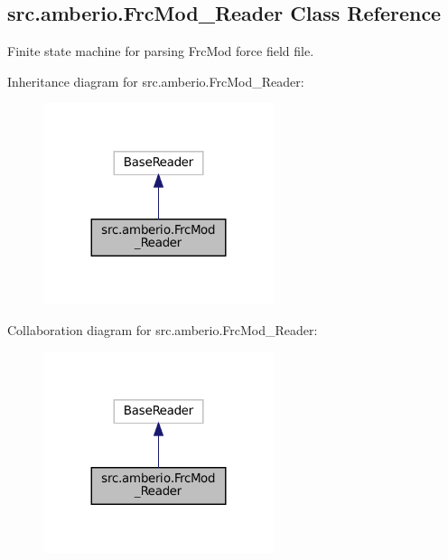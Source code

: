 \hypertarget{classsrc_1_1amberio_1_1FrcMod__Reader}{}\subsection{src.\+amberio.\+Frc\+Mod\+\_\+\+Reader Class Reference}
\label{classsrc_1_1amberio_1_1FrcMod__Reader}


Finite state machine for parsing Frc\+Mod force field file.  




Inheritance diagram for src.\+amberio.\+Frc\+Mod\+\_\+\+Reader\+:
\nopagebreak
\begin{figure}[H]
\begin{center}
\leavevmode
\includegraphics[width=191pt]{classsrc_1_1amberio_1_1FrcMod__Reader__inherit__graph}
\end{center}
\end{figure}


Collaboration diagram for src.\+amberio.\+Frc\+Mod\+\_\+\+Reader\+:
\nopagebreak
\begin{figure}[H]
\begin{center}
\leavevmode
\includegraphics[width=191pt]{classsrc_1_1amberio_1_1FrcMod__Reader__coll__graph}
\end{center}
\end{figure}
